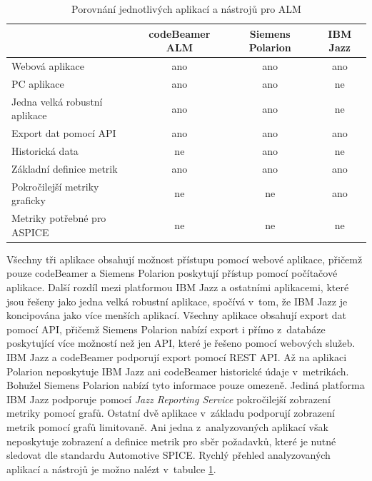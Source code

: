 \documentclass[czech,master]{diploma}
\begin{document}
\begin{table}[htp]
\begin{tabular}{@{}lccc@{}}
\toprule
\textbf{}                     & \textbf{codeBeamer ALM} & \textbf{Siemens Polarion} & \textbf{IBM Jazz} \\ \midrule
Webová aplikace               & ano                     & ano                       & ano               \\
PC aplikace                   & ano                     & ano                       & ne                \\
Jedna velká robustní aplikace & ano                     & ano                       & ne                \\
Export dat pomocí API         & ano                     & ano                       & ano               \\
Historická data               & ne                     & ano                       & ne                \\
Základní definice metrik      & ano                     & ano                       & ano               \\
Pokročilejší metriky graficky & ne                      & ne                        & ano               \\
Metriky potřebné pro ASPICE  & ne                      & ne                        & ne                \\ \bottomrule
\end{tabular}
\caption{Porovnání jednotlivých aplikací a nástrojů pro ALM}
\label{tab:alm_porovnani}
\end{table}

Všechny tři aplikace obsahují možnost přístupu pomocí webové aplikace, přičemž pouze codeBeamer a Siemens Polarion poskytují přístup pomocí počítačové aplikace. Další rozdíl mezi platformou IBM Jazz a ostatními aplikacemi, které jsou řešeny jako jedna velká robustní aplikace, spočívá v~tom, že IBM Jazz je koncipována jako více menších aplikací. Všechny aplikace obsahují export dat pomocí API, přičemž Siemens Polarion nabízí export i přímo z~databáze poskytující více možností než jen API, které je řešeno pomocí webových služeb. IBM Jazz a codeBeamer podporují export pomocí REST API. Až na aplikaci Polarion neposkytuje IBM Jazz ani codeBeamer historické údaje v~metrikách. Bohužel Siemens Polarion nabízí tyto informace pouze omezeně. Jediná platforma IBM Jazz podporuje pomocí \textit{Jazz Reporting Service} pokročilejší zobrazení metriky pomocí grafů. Ostatní dvě aplikace v~základu podporují zobrazení metrik pomocí grafů limitovaně. Ani jedna z~analyzovaných aplikací však neposkytuje zobrazení a definice metrik pro sběr požadavků, které je nutné sledovat dle standardu Automotive SPICE. Rychlý přehled analyzovaných aplikací a nástrojů je možno nalézt v~tabulce \ref{tab:alm_porovnani}.
\end{document}
